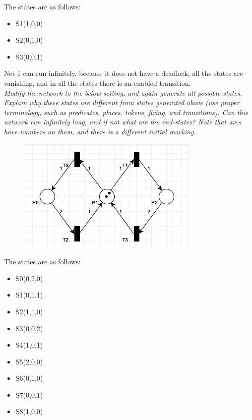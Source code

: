 \documentclass[letterpaper]{article}
\begin{document}
The states are as follows:
\begin{itemize}
 \item S1(1,0,0)
 \item S2(0,1,0)
 \item S3(0,0,1)
\end{itemize}

Net 1 can run infinitely, because it does not have a deadlock, all the states
are vanishing, and in all the states there is an enabled transition.\\

\textit{Modify the network to the below setting, and again generate all possible states. Explain why these states are different from states generated above (use proper terminology, such as predicates, places, tokens, firing, and transitions). Can this network run infinitely long, and if not what are the end-states?
 Note that arcs have numbers on them, and there is a different initial marking.
}

\begin{figure}[H]
 \centering
 \includegraphics[width=\textwidth]{image2.png}
\end{figure}

The states are as follows:
\begin{itemize}
 \item S0(0,2,0)
 \item S1(0,1,1)
 \item S2(1,1,0)
 \item S3(0,0,2)
 \item S4(1,0,1)
 \item S5(2,0,0)
 \item S6(0,1,0)
 \item S7(0,0,1)
 \item S8(1,0,0)
\end{itemize}
\end{document}
